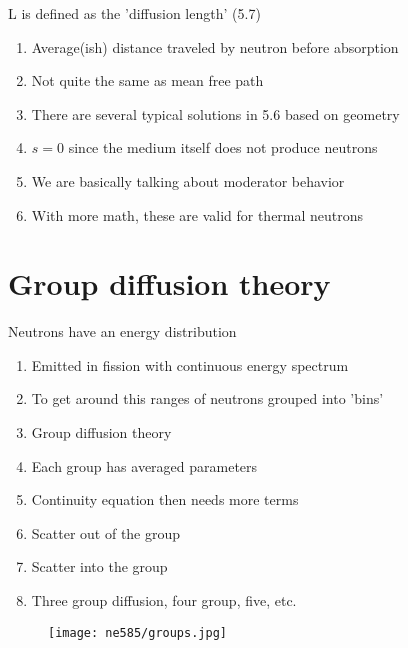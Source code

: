 \documentclass[aspectratio=1610,pdftex,dvipsnames,compress,xcolor={dvipsnames}]{beamer}
\begin{document}
\addtocounter{framenumber}{-1} 
\begin{frame}{L is defined as the 'diffusion length' (5.7)}
    \begin{enumerate}[series=outerlist,topsep=0pt,itemsep=21pt,leftmargin=*,label=(\arabic*)]
        \item[]Average(ish) distance traveled by neutron before absorption
        \item[]Not quite the same as mean free path
        \item[]There are several typical solutions in 5.6 based on geometry
        \item[]$s = 0$ since the medium itself does not produce neutrons
        \item[]We are basically talking about moderator behavior
        \item[]With more math, these are valid for thermal neutrons
    \end{enumerate}
\end{frame}


\section{Group diffusion theory}


\addtocounter{framenumber}{-1} 
\begin{frame}{Neutrons have an energy distribution}
    \begin{enumerate}[series=outerlist,topsep=0pt,itemsep=17pt,leftmargin=*,label=(\arabic*)]
        \item[]Emitted in fission with continuous energy spectrum
        \item[]To get around this ranges of neutrons grouped into 'bins'
        \item[]Group diffusion theory
        \item[]Each group has averaged parameters
        \item[]Continuity equation then needs more terms
        \item[]Scatter out of the group
        \item[]Scatter into the group
        \item[]Three group diffusion, four group, five, etc.
    \end{enumerate}
\end{frame}


\begin{frame}{}
    \begin{figure}
        \centering
        \texttt{[image: ne585/groups.jpg]}
    \end{figure}
\end{frame}
\end{document}
